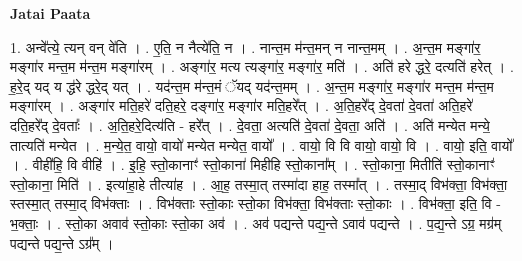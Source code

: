 \documentclass[17pt]{extarticle}
\begin{document}
\textbf{Jatai Paata} \newline

1. अन्वे᳚त्ये॒ त्यन् वन् वे॑ति । . ए॒ति॒ न नैत्ये॑ति॒ न । . नान्त॒म म॑न्त॒मन् न नान्त॒मम् । . अ॒न्त॒म मङ्गा॑र॒ मङ्गा॑र मन्त॒म म॑न्त॒म मङ्गा॑रम् । . अङ्गा॑र॒ मत्य त्यङ्गा॑र॒ मङ्गा॑र॒ मति॑ । . अति॑ हरे द्धरे॒ दत्यति॑ हरेत् । . ह॒रे॒द् यद् य द्ध॑रे द्धरे॒द् यत् । . यद॑न्त॒म म॑न्त॒मं ॅयद् यद॑न्त॒मम् । . अ॒न्त॒म मङ्गा॑र॒ मङ्गा॑र मन्त॒म म॑न्त॒म मङ्गा॑रम् । . अङ्गा॑र मति॒हरे॑ दति॒हरे॒ दङ्गा॑र॒ मङ्गा॑र मति॒हरे᳚त् । . अ॒ति॒हरे᳚द् दे॒वता॑ दे॒वता॑ अति॒हरे॑ दति॒हरे᳚द् दे॒वताः᳚ । . अ॒ति॒हरे॒दित्य॑ति - हरे᳚त् । . दे॒वता॒ अत्यति॑ दे॒वता॑ दे॒वता॒ अति॑ । . अति॑ मन्येत मन्ये॒ तात्यति॑ मन्येत । . म॒न्ये॒त॒ वायो॒ वायो॑ मन्येत मन्येत॒ वायो᳚ । . वायो॒ वि वि वायो॒ वायो॒ वि । . वायो॒ इति॒ वायो᳚ । . वीही॑हि॒ वि वीहि॑ । . इ॒हि॒ स्तो॒कानाꣳ॑ स्तो॒काना॑ मिहीहि स्तो॒काना᳚म् । . स्तो॒काना॒ मितीति॑ स्तो॒कानाꣳ॑ स्तो॒काना॒ मिति॑ । . इत्या॑हा॒हे तीत्या॑ह । . आ॒ह॒ तस्मा॒त् तस्मा॑दा हाह॒ तस्मा᳚त् । . तस्मा॒द् विभ॑क्ता॒ विभ॑क्ता॒ स्तस्मा॒त् तस्मा॒द् विभ॑क्ताः । . विभ॑क्ताः स्तो॒काः स्तो॒का विभ॑क्ता॒ विभ॑क्ताः स्तो॒काः । . विभ॑क्ता॒ इति॒ वि - भ॒क्ताः॒ । . स्तो॒का अवाव॑ स्तो॒काः स्तो॒का अव॑ । . अव॑ पद्यन्ते पद्य॒न्ते ऽवाव॑ पद्यन्ते । . प॒द्य॒न्ते ऽग्र॒ मग्र॑म् पद्यन्ते पद्य॒न्ते ऽग्र᳚म् । \newline
\end{document}
